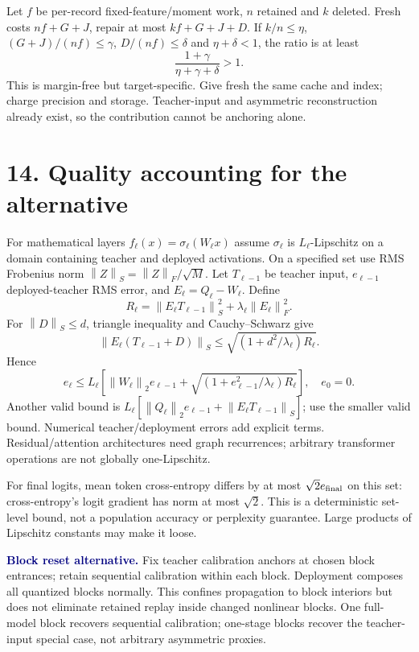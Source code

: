 \documentclass[11pt]{article}
\newcommand{\norm}[1]{\left\|#1\right\|}\newcommand{\tr}{\operatorname{tr}}
\newcommand{\note}[1]{\textcolor{navy}{\textbf{#1}}}
\begin{document}
Let $f$ be per-record fixed-feature/moment work, $n$ retained and $k$ deleted. Fresh costs $nf+G+J$, repair at most $kf+G+J+D$. If $k/n\leq\eta$, $(G+J)/(nf)\leq\gamma$, $D/(nf)\leq\delta$ and $\eta+\delta<1$, the ratio is at least
\[
 \frac{1+\gamma}{\eta+\gamma+\delta}>1. \tag{17}
\]
This is margin-free but target-specific. Give fresh the same cache and index; charge precision and storage. Teacher-input and asymmetric reconstruction already exist, so the contribution cannot be anchoring alone.

\newpage
\section*{14. Quality accounting for the alternative}
For mathematical layers $f_\ell(x)=\sigma_\ell(W_\ell x)$ assume $\sigma_\ell$ is $L_\ell$-Lipschitz on a domain containing teacher and deployed activations. On a specified set use RMS Frobenius norm $\norm Z_S=\norm Z_F/\sqrt M$. Let $T_{\ell-1}$ be teacher input, $e_{\ell-1}$ deployed-teacher RMS error, and $E_\ell=Q_\ell-W_\ell$. Define
\[
 R_\ell=\norm{E_\ell T_{\ell-1}}_S^2+\lambda_\ell\norm{E_\ell}_F^2.
\]
For $\norm D_S\leq d$, triangle inequality and Cauchy--Schwarz give
\[
 \norm{E_\ell(T_{\ell-1}+D)}_S
 \leq\sqrt{(1+d^2/\lambda_\ell)R_\ell}.
\]
Hence
\[
 e_\ell\leq L_\ell\left[\norm{W_\ell}_2e_{\ell-1}
 +\sqrt{(1+e_{\ell-1}^2/\lambda_\ell)R_\ell}\right],\quad e_0=0. \tag{18}
\]
Another valid bound is $L_\ell[\norm{Q_\ell}_2e_{\ell-1}+\norm{E_\ell T_{\ell-1}}_S]$; use the smaller valid bound. Numerical teacher/deployment errors add explicit terms. Residual/attention architectures need graph recurrences; arbitrary transformer operations are not globally one-Lipschitz.

For final logits, mean token cross-entropy differs by at most $\sqrt2e_{\rm final}$ on this set: cross-entropy's logit gradient has norm at most $\sqrt2$. This is a deterministic set-level bound, not a population accuracy or perplexity guarantee. Large products of Lipschitz constants may make it loose.

\note{Block reset alternative.} Fix teacher calibration anchors at chosen block entrances; retain sequential calibration within each block. Deployment composes all quantized blocks normally. This confines propagation to block interiors but does not eliminate retained replay inside changed nonlinear blocks. One full-model block recovers sequential calibration; one-stage blocks recover the teacher-input special case, not arbitrary asymmetric proxies.
\end{document}

